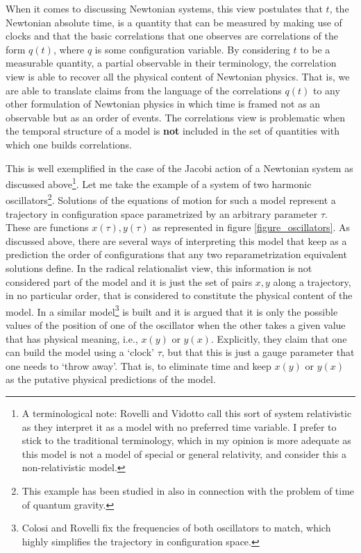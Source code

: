 \documentclass[12 pt]{article}
\begin{document}
When it comes to discussing Newtonian systems, this view postulates that $t$, the Newtonian absolute time, is a quantity that can be measured by making use of clocks and that the basic correlations that one observes are correlations of the form $q(t)$, where $q$ is some configuration variable. By considering $t$ to be a measurable quantity, a partial observable in their terminology, the correlation view is able to recover all the physical content of Newtonian physics. That is, we are able to translate claims from the language of the correlations $q(t)$ to any other formulation of Newtonian physics in which time is framed not as an observable but as an order of events. The correlations view is problematic when the temporal structure of a model is \textbf{not} included in the set of quantities with which one builds correlations.

This is well exemplified in the case of the Jacobi action of a Newtonian system as discussed above\footnote{A terminological note: Rovelli and Vidotto call this sort of system relativistic as they interpret it as a model with no preferred time variable. I prefer to stick to the traditional terminology, which in my opinion is more adequate as this model is not a model of special or general relativity, and consider this a non-relativistic model.}. Let me take the example of a system of two harmonic oscillators\footnote{This example has been studied in \citep{MozotaFrauca2023} also in connection with the problem of time of quantum gravity.}. Solutions of the equations of motion for such a model represent a trajectory in configuration space parametrized by an arbitrary parameter $\tau$. These are functions $x(\tau),y(\tau)$ as represented in figure \ref{figure_oscillators}. As discussed above, there are several ways of interpreting this model that keep as a prediction the order of configurations that any two reparametrization equivalent solutions define. In the radical relationalist view, this information is not considered part of the model and it is just the set of pairs $x,y$ along a trajectory, in no particular order, that is considered to constitute the physical content of the model. In \citep{Colosi2003,Rovelli2004} a similar model\footnote{Colosi and Rovelli fix the frequencies of both oscillators to match, which highly simplifies the trajectory in configuration space.} is built and it is argued that it is only the possible values of the position of one of the oscillator when the other takes a given value that has physical meaning, i.e., $x(y)$ or $y(x)$. Explicitly, they claim that one can build the model using a `clock' $\tau$, but that this is just a gauge parameter that one needs to `throw away'. That is, to eliminate time and keep $x(y)$ or $y(x)$ as the putative physical predictions of the model.
\end{document}
